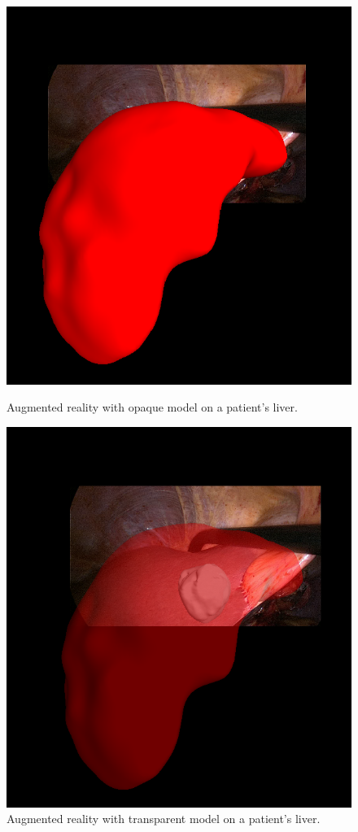 \documentclass[12pt]{report}
\begin{document}
\begin{figure}[H]
\centerline{\includegraphics[scale = 0.5]{img/image_2.png}}
\caption{Augmented reality with opaque model on a patient's liver.}
\label{opaquemodel}
\endminipage\hfill
{}
\centerline{\includegraphics[scale = 0.5]{img/image_1.png}}
\caption{Augmented reality with transparent model on a patient's liver.}
\label{transparentmodel}
\endminipage
\end{figure}
\end{document}
